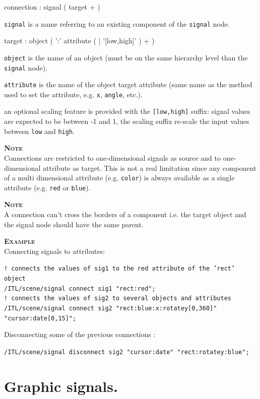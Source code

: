 \documentclass[a4paper,twoside]{report}
\newcommand{\sublevel}[1]	{\section{#1}}
\newcommand{\OSC}[1]		{\texttt{#1}}
\newcommand{\example}		{\textbf{\hspace{-1.5cm}\textbf{\textsc{Example }}}}
\newcommand{\note}	[1]		{\vspace{2mm}\textbf{\hspace{-1.03cm}\textbf{\textsc{Note #1}}}}
\let\olditemize\itemize
\let\oldenditemize\enditemize
\renewenvironment{itemize} 	{\olditemize \setlength{\itemsep}{1mm}}{\oldenditemize}
\newcommand{\sample}	[1]			{\vspace{-2mm}\begin{center}\colorbox{mygrey}{
								\begin{minipage}[t]{0.9\columnwidth} 
								{\small \texttt{#1}}
								\end{minipage}}\end{center}}
\begin{document}
\begin{rail}
connection : signal ( target + )
\end{rail}
\begin{itemize}
\item \OSC{signal} is a name referring to an existing component of the \OSC{signal} node. 
\end{itemize}

\begin{rail}
target :  object ( ':' attribute ( | '[low,high]' ) + )
\end{rail}
\begin{itemize}
\item \OSC{object} is the name of an object (must be on the same hierarchy level than the \OSC{signal} node).
\item \OSC{attribute} is the name of the object target attribute (same name as the method used to set the attribute, e.g. \OSC{x}, \OSC{angle}, etc.).
\item an optional scaling feature is provided with the \OSC{[low,high]} suffix: signal values are expected to be between -1 and 1, the scaling suffix re-scale the input values between \OSC{low} and \OSC{high}.
\end{itemize}

\note{} \\
Connections are restricted to one-dimensional signals as source and to one-dimensional attribute as target. This is not a real limitation since any component of a multi dimensional attribute (e.g. \OSC{color}) is always available as a single attribute (e.g. \OSC{red} or \OSC{blue}).

\note{} \\
A connection can't cross the borders of a component i.e. the target object and the signal node should have the same parent.

\example \\
Connecting signals to attributes:
\sample{! connects the values of sig1 to the red attribute of the 'rect' object \\
/ITL/scene/signal connect sig1 "rect:red"; \\
! connects the values of sig2 to several objects and attributes \\
/ITL/scene/signal connect sig2 "rect:blue:x:rotatey[0,360]" "cursor:date[0,15]";}
Disconnecting some of the previous connections :
\sample{/ITL/scene/signal disconnect sig2 "cursor:date" "rect:rotatey:blue"; }

\sublevel{Graphic signals.}
\label{gsignal}
\end{document}
